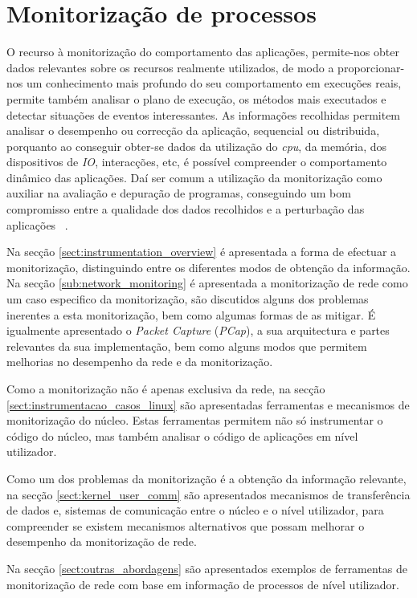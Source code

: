 \chapter{Monitorização de processos}
\label{cap:trabrelacionado}
O recurso à monitorização do comportamento das aplicações, permite-nos obter dados relevantes sobre os recursos realmente utilizados, de modo a proporcionar-nos um conhecimento mais profundo do seu comportamento em execuções reais, permite também analisar o plano de execução, os métodos mais executados e detectar situações de eventos interessantes.
As informações recolhidas permitem analisar o desempenho ou correcção da aplicação, sequencial ou distribuida, porquanto ao conseguir obter-se dados da utilização do \textit{cpu}, da memória, dos dispositivos de \textit{IO}, interacções, etc, é possível compreender o comportamento dinâmico das aplicações.
Daí ser comum a utilização da monitorização como auxiliar na avaliação e depuração de programas, conseguindo um bom compromisso entre a qualidade dos dados recolhidos e a perturbação das aplicações ~\cite{DuartePhd05}.
 
Na secção \ref{sect:instrumentation_overview} é apresentada a forma de efectuar a monitorização, distinguindo entre os diferentes modos de obtenção da informação.
Na secção \ref{sub:network_monitoring} é apresentada a monitorização de rede como um caso especifico da monitorização, são discutidos alguns dos problemas inerentes a esta monitorização, bem como algumas formas de as mitigar.
É igualmente apresentado o \textit{Packet Capture} (\textit{PCap}), a sua arquitectura e partes relevantes da sua implementação, bem como alguns modos que permitem melhorias no desempenho da rede e da monitorização.

Como a monitorização não é apenas exclusiva da rede, na secção \ref{sect:instrumentacao_casos_linux} são apresentadas ferramentas e mecanismos de monitorização do núcleo.
Estas ferramentas permitem não só instrumentar o código do núcleo, mas também analisar o código de aplicações em nível utilizador.

Como um dos problemas da monitorização é a obtenção da informação relevante, na secção \ref{sect:kernel_user_comm} são apresentados mecanismos de transferência de dados e, sistemas de comunicação entre o núcleo e o nível utilizador, para compreender se existem mecanismos alternativos que possam melhorar o desempenho da monitorização de rede.

Na secção \ref{sect:outras_abordagens} são apresentados exemplos de ferramentas de monitorização de rede com base em informação de processos de nível utilizador.

